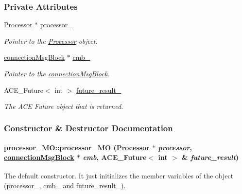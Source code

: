 \subsubsection*{Private Attributes}
\begin{CompactItemize}
\item 
\hyperlink{classProcessor}{Processor} $\ast$ \hyperlink{classprocessor__MO_processor__MOo0}{processor\_\-}
\begin{CompactList}\small\item\em Pointer to the \hyperlink{classProcessor}{Processor} object.\item\end{CompactList}\item 
\hyperlink{classconnectionMsgBlock}{connection\-Msg\-Block} $\ast$ \hyperlink{classprocessor__MO_processor__MOo1}{cmb\_\-}
\begin{CompactList}\small\item\em Pointer to the \hyperlink{classconnectionMsgBlock}{connection\-Msg\-Block}.\item\end{CompactList}\item 
ACE\_\-Future$<$ int $>$ \hyperlink{classprocessor__MO_processor__MOo2}{future\_\-result\_\-}
\begin{CompactList}\small\item\em The ACE Future object that is returned.\item\end{CompactList}\end{CompactItemize}


\subsubsection{Constructor \& Destructor Documentation}
\hypertarget{classprocessor__MO_processor__MOa0}{
\paragraph[processor\_\-MO]{\setlength{\rightskip}{0pt plus 5cm}processor\_\-MO::processor\_\-MO (\hyperlink{classProcessor}{Processor} $\ast$ {\em processor}, \hyperlink{classconnectionMsgBlock}{connection\-Msg\-Block} $\ast$ {\em cmb}, ACE\_\-Future$<$ int $>$ \& {\em future\_\-result})}\hfill}
\label{classprocessor__MO_processor__MOa0}


The default constructor. It just initializes the member variables of the object (processor\_\-, cmb\_\- and future\_\-result\_\-). 


